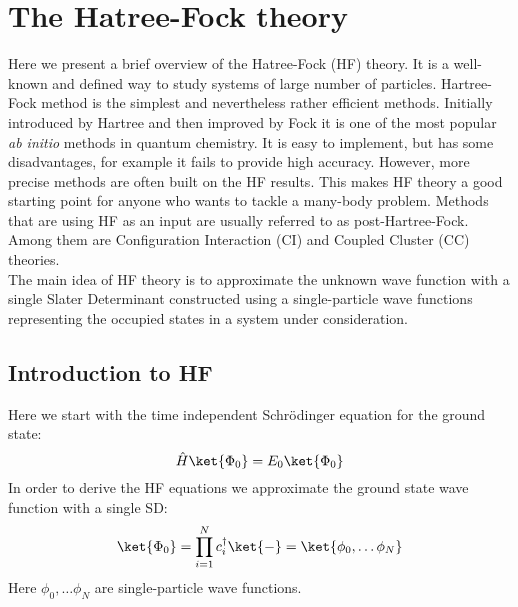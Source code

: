 \chapter{The Hatree-Fock theory}\label{ch:HF}
Here we present a brief overview of the Hatree-Fock (HF) theory. It is
a well-known and defined way to study systems of large number of
particles. Hartree-Fock method is the simplest and nevertheless rather
efficient methods. Initially introduced by Hartree and then improved
by Fock it is one of the most popular \textit{ab initio} methods in
quantum chemistry.  It is easy to implement, but has some
disadvantages, for example it fails to provide high accuracy. However,
more precise methods are often built on the HF results. This makes HF
theory a good starting point for anyone who wants to tackle a many-body
problem. Methods that are using HF as an input are usually referred to
as post-Hartree-Fock. Among them are Configuration Interaction (CI)
and Coupled Cluster (CC) theories. \\ The main idea of HF theory is to
approximate the unknown wave function with a single Slater Determinant
constructed using a single-particle wave functions representing the
occupied states in a system under consideration.
\section{Introduction to HF}
Here we start with the time independent Schr\"{o}dinger equation for the ground state:
\begin{equation}
\hat{H}\ket{\Phi_0}=E_0\ket{\Phi_0}
\end{equation}
In order to derive the HF equations we approximate the ground state wave function with a single SD:
\begin{equation}
\ket{\Phi_0}=\prod_{i=1}^{N}c_i^\dagger\ket{-}=\ket{\phi_0, \dots \phi_N}
\end{equation}
Here $\phi_0, \dots \phi_N$ are single-particle wave functions.

